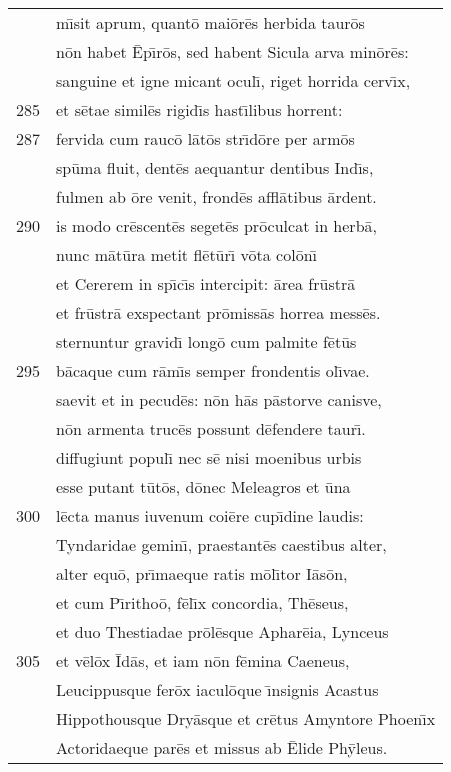 \documentclass[paper=6in:9in,pagesize=pdftex,
               headinclude=on,footinclude=on,12pt]{scrbook}
\begin{document}
\begin{longtable}[p]{ r l }
 & m\={\i}sit aprum, quant\=o mai\=or\=es herbida taur\=os\\ 
 & n\=on habet \=Ep\={\i}r\=os, sed habent Sicula arva min\=or\=es:\\ 
 & sanguine et igne micant ocul\={\i}, riget horrida cerv\={\i}x,\\ 
285 & et s\=etae simil\=es rigid\={\i}s hast\={\i}libus horrent:\\ 
287 & fervida cum rauc\=o l\=at\=os str\={\i}d\=ore per arm\=os\\ 
 & sp\=uma fluit, dent\=es aequantur dentibus Ind\={\i}s,\\ 
 & fulmen ab \=ore venit, frond\=es affl\=atibus \=ardent.\\ 
290 & is modo cr\=escent\=es seget\=es pr\=oculcat in herb\=a,\\ 
 & nunc m\=at\=ura metit fl\=et\=ur\={\i} v\=ota col\=on\={\i}\\ 
 & et Cererem in sp\={\i}c\={\i}s intercipit: \=area fr\=ustr\=a\\ 
 & et fr\=ustr\=a exspectant pr\=omiss\=as horrea mess\=es.\\ 
 & sternuntur gravid\={\i} long\=o cum palmite f\=et\=us\\ 
295 & b\=acaque cum r\=am\={\i}s semper frondentis ol\={\i}vae.\\ 
 & saevit et in pecud\=es: n\=on h\=as p\=astorve canisve,\\ 
 & n\=on armenta truc\=es possunt d\=efendere taur\={\i}.\\ 
 & diffugiunt popul\={\i} nec s\=e nisi moenibus urbis\\ 
 & esse putant t\=ut\=os, d\=onec Meleagros et \=una\\ 
300 & l\=ecta manus iuvenum coi\=ere cup\={\i}dine laudis:\\ 
 & Tyndaridae gemin\={\i}, praestant\=es caestibus alter,\\ 
 & alter equ\=o, pr\={\i}maeque ratis m\=ol\={\i}tor I\=as\=on,\\ 
 & et cum P\={\i}ritho\=o, f\=el\={\i}x concordia, Th\=eseus,\\ 
 & et duo Thestiadae pr\=ol\=esque Aphar\=eia, Lynceus\\ 
305 & et v\=el\=ox \=Id\=as, et iam n\=on f\=emina Caeneus,\\ 
 & Leucippusque fer\=ox iacul\=oque \={\i}nsignis Acastus\\ 
 & Hippothousque Dry\=asque et cr\=etus Amyntore Phoen\={\i}x\\ 
 & Actoridaeque par\=es et missus ab \=Elide Ph\=yleus.\\ 

\end{longtable}
\end{document}
